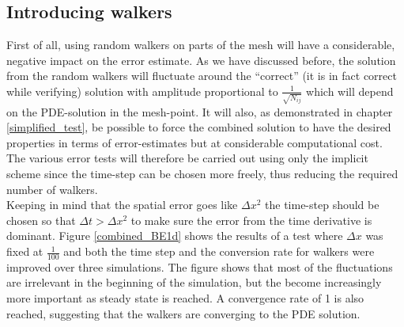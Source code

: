 \subsection{Introducing walkers}


First of all, using random walkers on parts of the mesh will have a considerable, negative impact on the error estimate. 
As we have discussed before, the solution from the random walkers will fluctuate around the ``correct'' (it is in fact correct while verifying) solution with amplitude proportional to $\frac{1}{\sqrt{N_{ij}}}$ which will depend on the PDE-solution in the mesh-point. 
It will also, as demonstrated in chapter \ref{simplified_test}, be possible to force the combined solution to have the desired properties in terms of error-estimates but at considerable computational cost. 
The various error tests will therefore be carried out using only the implicit scheme since the time-step can be chosen more freely, thus reducing the required number of walkers.\\
Keeping in mind that the spatial error goes like $\Delta x^2$ the time-step should be chosen so that $\Delta t> \Delta x^2$ to make sure the error from the time derivative is dominant. 
Figure \ref{combined_BE1d} shows the results of a test where $\Delta x$ was fixed at $\frac{1}{100}$ and both the time step and the conversion rate for walkers were improved over three simulations. 
The figure shows that most of the fluctuations are irrelevant in the beginning of the simulation, but the become increasingly more important as steady state is reached. 
A convergence rate of 1 is also reached, suggesting that the walkers are converging to the PDE solution. 


